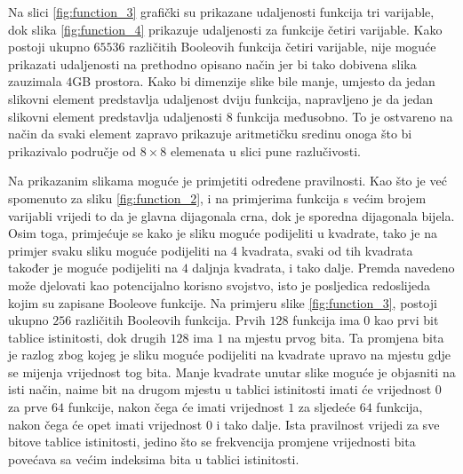 Na slici \ref{fig:function_3} grafički su prikazane udaljenosti funkcija tri varijable, dok slika \ref{fig:function_4} prikazuje udaljenosti za funkcije četiri varijable. 
Kako postoji ukupno $65536$ različitih Booleovih funkcija četiri varijable, nije moguće prikazati udaljenosti na prethodno opisano način jer bi tako dobivena slika zauzimala $4$GB prostora.
Kako bi dimenzije slike bile manje, umjesto da jedan slikovni element predstavlja udaljenost dviju funkcija, napravljeno je da jedan slikovni element predstavlja udaljenosti $8$ funkcija međusobno.
To je ostvareno na način da svaki element zapravo prikazuje aritmetičku sredinu onoga što bi prikazivalo područje od $8\times8$ elemenata u slici pune razlučivosti.

Na prikazanim slikama moguće je primjetiti određene pravilnosti.
Kao što je već spomenuto za sliku \ref{fig:function_2}, i na primjerima funkcija s većim brojem varijabli vrijedi to da je glavna dijagonala crna, dok je sporedna dijagonala bijela.
Osim toga, primjećuje se kako je sliku moguće podijeliti u kvadrate, tako je na primjer svaku sliku moguće podijeliti na $4$ kvadrata, svaki od tih kvadrata također je moguće podijeliti na $4$ daljnja kvadrata, i tako dalje.
Premda navedeno može djelovati kao potencijalno korisno svojstvo, isto je posljedica redoslijeda kojim su zapisane Booleove funkcije.
Na primjeru slike \ref{fig:function_3}, postoji ukupno $256$ različitih Booleovih funkcija.
Prvih $128$ funkcija ima $0$ kao prvi bit tablice istinitosti, dok drugih $128$ ima $1$ na mjestu prvog bita.
Ta promjena bita je razlog zbog kojeg je sliku moguće podijeliti na kvadrate upravo na mjestu gdje se mijenja vrijednost tog bita.
Manje kvadrate unutar slike moguće je objasniti na isti način, naime bit na drugom mjestu u tablici istinitosti imati će vrijednost $0$ za prve $64$ funkcije, nakon čega će imati vrijednost $1$ za sljedeće $64$ funkcija, nakon čega će opet imati vrijednost $0$ i tako dalje.
Ista pravilnost vrijedi za sve bitove tablice istinitosti, jedino što se frekvencija promjene vrijednosti bita povećava sa većim indeksima bita u tablici istinitosti.


